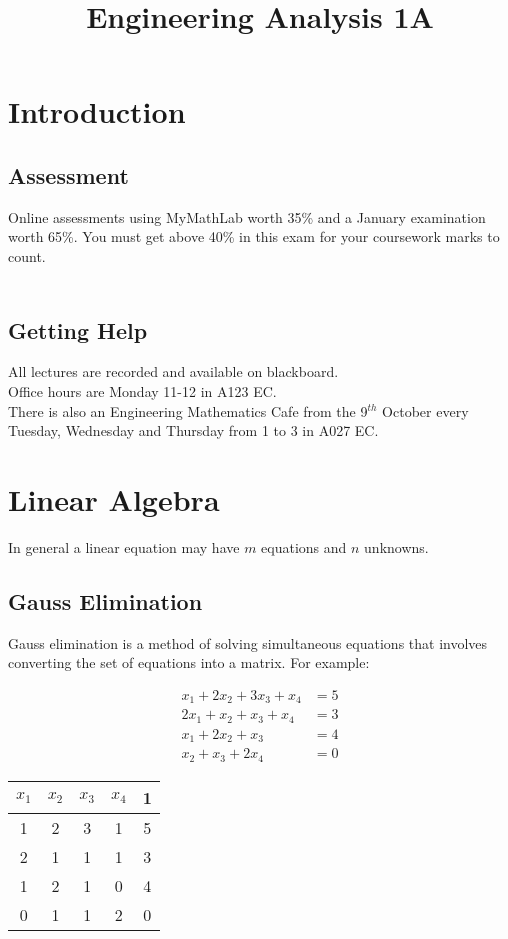 \documentclass[12pt,a4paper]{article}
\begin{document}
\title{Engineering Analysis 1A}
\date{}
\maketitle

\newpage

\tableofcontents

\newpage

\section{Introduction}
	\subsection{Assessment}
	Online assessments using MyMathLab worth 35\% and a January examination worth 65\%. You must get above 40\% in this exam for your coursework marks to count. 	\\
	\\
	
	\subsection{Getting Help}
			All lectures are recorded and available on blackboard. 
		\\
		Office hours are Monday 11-12 in A123 EC.
		\\
		There is also an Engineering Mathematics Cafe from the 9$^{th}$ October every Tuesday, Wednesday and Thursday from 1 to 3 in A027 EC.
		
\newpage
		
\section{Linear Algebra}	

	In general a linear equation may have $m$ equations and $n$ unknowns. 
	
	\subsection{Gauss Elimination}
		Gauss elimination is a method of solving simultaneous equations that involves converting the set of equations into a matrix. For example: 
		\\
		\begin{multicols}{2}
		
		\begin{align*}
			x_1 + 2x_2 +3x_3 + x_4 &= 5 \\
			2x_1+x_2+x_3+x_4 &= 3 \\
			x_1+2x_2+x_3 &= 4 \\
			x_2+x_3+2x_4 &= 0 
		\end{align*}
		\break
		\begin{tabular}{c c c c | c}
			$x_1$ & $x_2$ & $x_3$ & $x_4$ & 1 \\
			\hline
			1 & 2 & 3 & 1 & 5 \\
			2 & 1 & 1 & 1 & 3 \\
			1 &2 & 1 & 0 & 4 \\
			0 & 1 & 1 &2 & 0
		\end{tabular}	
		\end{multicols}
		
\end{document}
